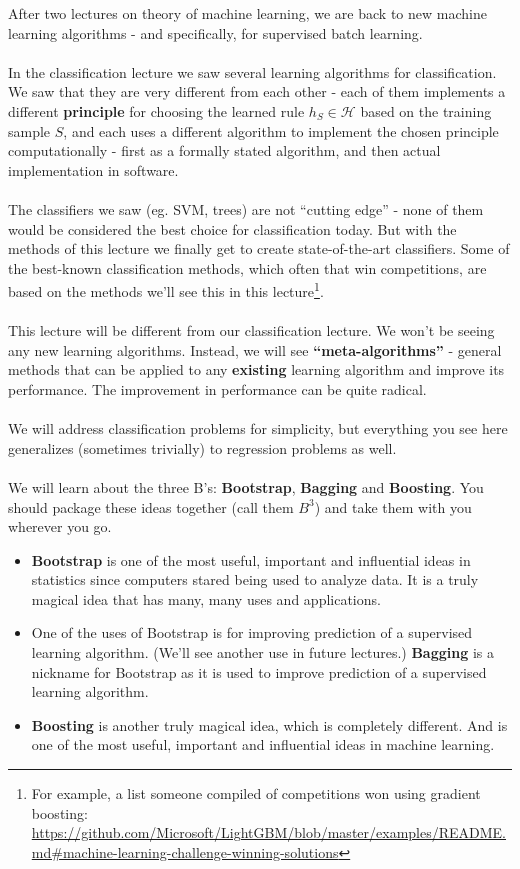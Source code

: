 \documentclass[11pt]{article}
\newcommand{\Hc}{\mathcal{H}}
\begin{document}
After two lectures on theory of machine learning, we are back to new
machine learning algorithms - and specifically, 
for supervised batch learning. 
\\~\\
In the classification lecture we saw several learning algorithms for
classification. We saw that they are very different from each other - each of
them implements
a different {\bf principle} for choosing the learned rule $h_S\in\Hc$ based on the
training sample $S$, and each uses a different algorithm to implement the chosen
principle computationally - first as a formally stated algorithm, and then
actual implementation in software.
\\~\\
The classifiers we saw (eg. SVM, trees) are not ``cutting edge'' - none of them
would be considered the best choice for classification today.
%
But with the methods
of this lecture we finally get to create state-of-the-art classifiers. 
Some of the best-known
classification methods, which often that win competitions, are based on the
methods we'll see this in this lecture\footnote{For example, a list someone compiled of competitions won using
  gradient boosting: 
\url{https://github.com/Microsoft/LightGBM/blob/master/examples/README.md\#machine-learning-challenge-winning-solutions}}.
\\~\\
This lecture will be different from our classification lecture. We won't
be seeing any new learning algorithms. Instead, we will see {\bf
``meta-algorithms''}
- general methods that can be applied to any {\bf existing} learning algorithm and
improve its performance. The improvement in performance can be quite
radical. 
\\~\\
We will address classification problems for simplicity, but everything you see
here generalizes (sometimes trivially) to regression problems as well.
\\~\\  
We will learn about the three B's: {\bf Bootstrap}, {\bf Bagging} and {\bf
Boosting}. You should package these ideas together (call them $B^3$) and take
them with you wherever you go.
\begin{itemize}
  \item {\bf Bootstrap} is one of the most useful, important and influential
    ideas in statistics since computers stared being used to analyze data. It
    is  a truly magical idea that has many, many uses and applications. 
  \item One of the uses of Bootstrap is for improving prediction of a supervised
    learning algorithm. (We'll see another use in future lectures.) 
    {\bf Bagging} is a nickname for Bootstrap as it is used to improve
    prediction of a supervised
    learning algorithm.
  \item  {\bf Boosting} is another truly magical idea, which is completely
    different. And is one of the most useful,
important and influential ideas in machine learning. 
\end{itemize}
\end{document}
